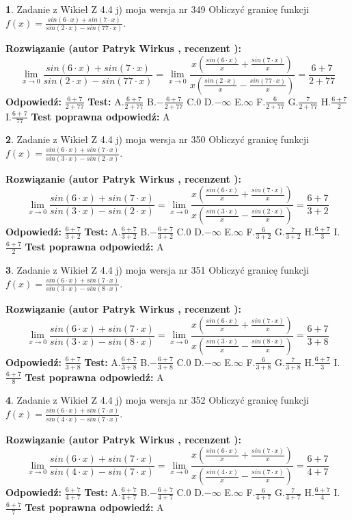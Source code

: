 \documentclass[12pt, a4paper]{article}
\theoremstyle{definition} %
\newtheorem{zad}{}
\newcommand{\zadStart}[1]{\begin{zad}#1\newline}
\newcommand{\zadStop}{\end{zad}}
\newcommand{\rozwStart}[2]{\noindent \textbf{Rozwiązanie (autor #1 , recenzent #2): }\newline}
\newcommand{\rozwStop}{\newline}
\newcommand{\odpStart}{\noindent \textbf{Odpowiedź:}\newline}
\newcommand{\odpStop}{\newline}
\newcommand{\testStart}{\noindent \textbf{Test:}\newline}
\newcommand{\testStop}{\newline}
\newcommand{\kluczStart}{\noindent \textbf{Test poprawna odpowiedź:}\newline}
\newcommand{\kluczStop}{\newline}
\begin{document}
\zadStart{Zadanie z Wikieł Z 4.4 j) moja wersja nr 349}
Obliczyć granicę funkcji $f(x)=\frac{sin(6\cdot x) +sin(7\cdot x)}{sin(2\cdot x) -sin(77\cdot x)}$.
\zadStop
\rozwStart{Patryk Wirkus}{}
$$\lim\limits_{x\to 0}\frac{sin(6\cdot x) +sin(7\cdot x)}{sin(2\cdot x) -sin(77\cdot x)}=\lim\limits_{x\to 0}\frac{x(\frac{sin(6\cdot x)}{x}+\frac{sin(7\cdot x)}{x})}{x(\frac{sin(2\cdot x)}{x}-\frac{sin(77\cdot x)}{x})}=\frac{6+7}{2+77}$$
\rozwStop
\odpStart
$\frac{6+7}{2+77}$
\odpStop
\testStart
A.$\frac{6+7}{2+77}$
B.$-\frac{6+7}{2+77}$
C.$0$
D.$-\infty$
E.$\infty$
F.$\frac{6}{2+77}$
G.$\frac{7}{2+77}$
H.$\frac{6+7}{2}$
I.$\frac{6+7}{77}$
\testStop
\kluczStart
A
\kluczStop



\zadStart{Zadanie z Wikieł Z 4.4 j) moja wersja nr 350}
Obliczyć granicę funkcji $f(x)=\frac{sin(6\cdot x) +sin(7\cdot x)}{sin(3\cdot x) -sin(2\cdot x)}$.
\zadStop
\rozwStart{Patryk Wirkus}{}
$$\lim\limits_{x\to 0}\frac{sin(6\cdot x) +sin(7\cdot x)}{sin(3\cdot x) -sin(2\cdot x)}=\lim\limits_{x\to 0}\frac{x(\frac{sin(6\cdot x)}{x}+\frac{sin(7\cdot x)}{x})}{x(\frac{sin(3\cdot x)}{x}-\frac{sin(2\cdot x)}{x})}=\frac{6+7}{3+2}$$
\rozwStop
\odpStart
$\frac{6+7}{3+2}$
\odpStop
\testStart
A.$\frac{6+7}{3+2}$
B.$-\frac{6+7}{3+2}$
C.$0$
D.$-\infty$
E.$\infty$
F.$\frac{6}{3+2}$
G.$\frac{7}{3+2}$
H.$\frac{6+7}{3}$
I.$\frac{6+7}{2}$
\testStop
\kluczStart
A
\kluczStop



\zadStart{Zadanie z Wikieł Z 4.4 j) moja wersja nr 351}
Obliczyć granicę funkcji $f(x)=\frac{sin(6\cdot x) +sin(7\cdot x)}{sin(3\cdot x) -sin(8\cdot x)}$.
\zadStop
\rozwStart{Patryk Wirkus}{}
$$\lim\limits_{x\to 0}\frac{sin(6\cdot x) +sin(7\cdot x)}{sin(3\cdot x) -sin(8\cdot x)}=\lim\limits_{x\to 0}\frac{x(\frac{sin(6\cdot x)}{x}+\frac{sin(7\cdot x)}{x})}{x(\frac{sin(3\cdot x)}{x}-\frac{sin(8\cdot x)}{x})}=\frac{6+7}{3+8}$$
\rozwStop
\odpStart
$\frac{6+7}{3+8}$
\odpStop
\testStart
A.$\frac{6+7}{3+8}$
B.$-\frac{6+7}{3+8}$
C.$0$
D.$-\infty$
E.$\infty$
F.$\frac{6}{3+8}$
G.$\frac{7}{3+8}$
H.$\frac{6+7}{3}$
I.$\frac{6+7}{8}$
\testStop
\kluczStart
A
\kluczStop



\zadStart{Zadanie z Wikieł Z 4.4 j) moja wersja nr 352}
Obliczyć granicę funkcji $f(x)=\frac{sin(6\cdot x) +sin(7\cdot x)}{sin(4\cdot x) -sin(7\cdot x)}$.
\zadStop
\rozwStart{Patryk Wirkus}{}
$$\lim\limits_{x\to 0}\frac{sin(6\cdot x) +sin(7\cdot x)}{sin(4\cdot x) -sin(7\cdot x)}=\lim\limits_{x\to 0}\frac{x(\frac{sin(6\cdot x)}{x}+\frac{sin(7\cdot x)}{x})}{x(\frac{sin(4\cdot x)}{x}-\frac{sin(7\cdot x)}{x})}=\frac{6+7}{4+7}$$
\rozwStop
\odpStart
$\frac{6+7}{4+7}$
\odpStop
\testStart
A.$\frac{6+7}{4+7}$
B.$-\frac{6+7}{4+7}$
C.$0$
D.$-\infty$
E.$\infty$
F.$\frac{6}{4+7}$
G.$\frac{7}{4+7}$
H.$\frac{6+7}{4}$
I.$\frac{6+7}{7}$
\testStop
\kluczStart
A
\kluczStop
\end{document}
